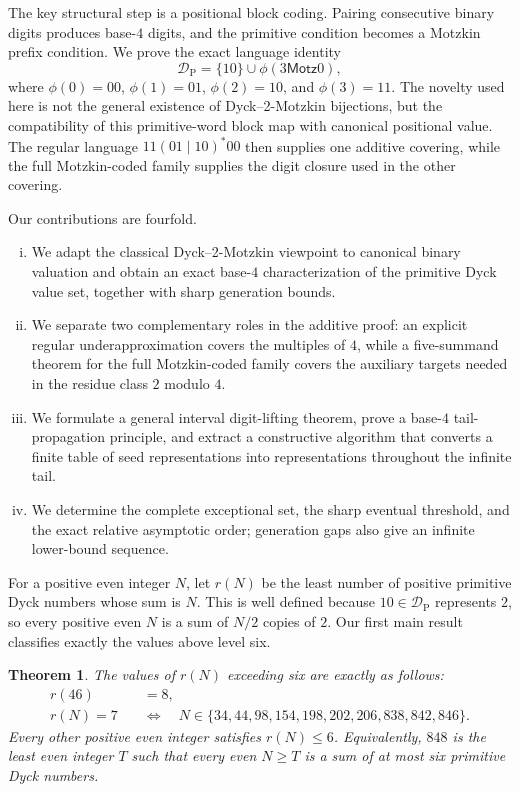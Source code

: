 \documentclass[11pt]{article}
\theoremstyle{plain}
\newtheorem{theorem}{Theorem}
\theoremstyle{definition}
\newcommand{\DP}{\mathcal{D}_{\mathrm{P}}}
\begin{document}
The key structural step is a positional block coding.  Pairing consecutive
binary digits produces base-$4$ digits, and the primitive condition becomes
a Motzkin prefix condition.  We prove the exact language identity
\[
 \DP=\{10\}\cup\phi(3\mathsf{Motz}0),
\]
where $\phi(0)=00$, $\phi(1)=01$, $\phi(2)=10$, and $\phi(3)=11$.
The novelty used here is not the general existence of Dyck--2-Motzkin
bijections, but the compatibility of this primitive-word block map with
canonical positional value.  The regular language $11(01\mid10)^*00$
then supplies one additive covering, while the full Motzkin-coded family
supplies the digit closure used in the other covering.

Our contributions are fourfold.
\begin{enumerate}[(i)]
\item We adapt the classical Dyck--2-Motzkin viewpoint to canonical binary
valuation and obtain an exact base-$4$ characterization of the primitive
Dyck value set, together with sharp generation bounds.
\item We separate two complementary roles in the additive proof: an
explicit regular underapproximation covers the multiples of $4$, while a
five-summand theorem for the full Motzkin-coded family covers the auxiliary
targets needed in the residue class $2$ modulo $4$.
\item We formulate a general interval digit-lifting theorem, prove a
base-$4$ tail-propagation principle, and extract a constructive algorithm
that converts a finite table of seed representations into representations
throughout the infinite tail.
\item We determine the complete exceptional set, the sharp eventual
threshold, and the exact relative asymptotic order; generation gaps also
give an infinite lower-bound sequence.
\end{enumerate}

For a positive even integer $N$, let $r(N)$ be the least number of positive
primitive Dyck numbers whose sum is $N$.  This is well defined because
$10\in\DP$ represents $2$, so every positive even $N$ is a sum of $N/2$
copies of $2$.  Our first main result classifies exactly the values above
level six.

\begin{theorem}\label{thm:classification}
The values of $r(N)$ exceeding six are exactly as follows:
\[
\begin{aligned}
 r(46)&=8,\\[4pt]
 r(N)=7\quad&\Longleftrightarrow\quad
 N\in\{34,44,98,154,198,202,206,838,842,846\}.
\end{aligned}
\]
Every other positive even integer satisfies $r(N)\leq6$.  Equivalently,
$848$ is the least even integer $T$ such that every even $N\geq T$ is a
sum of at most six primitive Dyck numbers.
\end{theorem}
\end{document}
